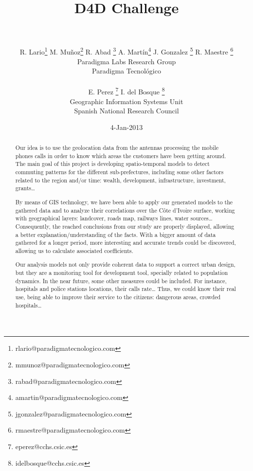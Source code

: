 \documentclass[a4paper,11pt]{article}
\begin{document}
\title{{\huge D4D Challenge} \\  \\ }

\author{{
				R. Lario\footnote{rlario@paradigmatecnologico.com} 
				M. Muñoz\footnote{mmunoz@paradigmatecnologico.com} 
				R. Abad \footnote{rabad@paradigmatecnologico.com} 
				A. Martín\footnote{amartin@paradigmatecnologico.com} 
				J. Gonzalez \footnote{jgonzalez@paradigmatecnologico.com} 
				R. Maestre \footnote{rmaestre@paradigmatecnologico.com} 
				\\\small Paradigma Labs Research Group \\\small Paradigma Tecnológico\\ \\
				E. Perez \footnote{eperez@cchs.csic.es} 
				I. del Bosque \footnote{idelbosque@cchs.csic.es} 
				\\\small Geographic Information Systems Unit \\\small Spanish National Research Council
				}}

\date{4-Jan-2013}
\maketitle

\begin{abstract} 
Our idea is to use the geolocation data from the antennas processing the mobile phones calls in order to know which areas the customers have been getting around. The main goal of this project is developing spatio-temporal models to detect commuting patterns for the different sub-prefectures, including some other factors related to the region and/or time: wealth, development, infrastructure, investment, grants…

By means of GIS technology, we have been able to apply our generated models to the gathered data and to analyze their correlations over the Côte d’Ivoire surface, working with geographical layers: landcover, roads map, railways lines, water sources… Consequently, the reached conclusions from our study are properly displayed, allowing a better explanation/understanding of the facts. With a bigger amount of data gathered for a longer period, more interesting and accurate trends could be discovered, allowing us to calculate associated coefficients.

Our analysis models not only provide coherent data to support a correct urban design, but they are a monitoring tool for development tool, specially related to population dynamics.
In the near future, some other measures could be included. For instance, hospitals and police stations locations, their calls rate… Thus, we could know their real use, being able to improve their service to the citizens: dangerous areas, crowded hospitals…
\end{abstract}

\newpage
\setcounter{secnumdepth}{0}















\newpage


\end{document}
